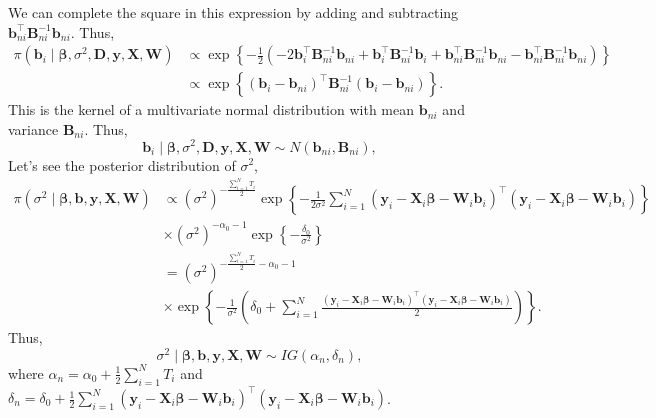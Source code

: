 We can complete the square in this expression by adding and subtracting $\bm{b}_{ni}^{\top}\bm{B}_{ni}^{-1}\bm{b}_{ni}$. Thus,
\begin{align*}
	\pi(\bm{b}_i\mid \bm{\beta},\sigma^2,\bm{D},\bm{y}, \bm{X}, \bm{W})&\propto \exp\left\{-\frac{1}{2}(-2\bm{b}_i^{\top}\bm{B}_{ni}^{-1}\bm{b}_{ni}+ \bm{b}_i^{\top}\bm{B}_{ni}^{-1}\bm{b}_i+\bm{b}_{ni}^{\top}\bm{B}_{ni}^{-1}\bm{b}_{ni}-\bm{b}_{ni}^{\top}\bm{B}_{ni}^{-1}\bm{b}_{ni})\right\}\\
	&\propto \exp\left\{(\bm{b}_i-\bm{b}_{ni})^{\top}\bm{B}_{ni}^{-1}(\bm{b}_i-\bm{b}_{ni})\right\}. 
\end{align*}
This is the kernel of a multivariate normal distribution with mean $\bm{b}_{ni}$ and variance $\bm{B}_{ni}$. Thus,
\begin{equation*}
	\bm{b}_i\mid \bm{\beta},\sigma^2,\bm{D},\bm{y}, \bm{X}, \bm{W} \sim {N}(\bm{b}_{ni},\bm{B}_{ni}), 
\end{equation*} 
Let's see the posterior distribution of $\sigma^2$,
\begin{align*}
	\pi(\sigma^2\mid \bm{\beta},\bm{b},\bm{y}, \bm{X}, \bm{W})&\propto (\sigma^2)^{-\frac{\sum_{i=1}^N T_i}{2}}\exp\left\{-\frac{1}{2\sigma^2}\sum_{i=1}^N(\bm{y}_i-\bm{X}_i\bm{\beta}-\bm{W}_i\bm{b}_i)^{\top}(\bm{y}_i-\bm{X}_i\bm{\beta}-\bm{W}_i\bm{b}_i)\right\}\\
	&\times (\sigma^2)^{-\alpha_0-1}\exp\left\{-\frac{\delta_0}{\sigma^2}\right\}\\
	&=(\sigma^2)^{-\frac{\sum_{i=1}^N T_i}{2}-\alpha_0-1}\\
	&\times \exp\left\{-\frac{1}{\sigma^2}\left(\delta_0+\sum_{i=1}^N\frac{(\bm{y}_i-\bm{X}_i\bm{\beta}-\bm{W}_i\bm{b}_i)^{\top}(\bm{y}_i-\bm{X}_i\bm{\beta}-\bm{W}_i\bm{b}_i)}{2}\right)\right\}. 
\end{align*}
Thus,
\begin{equation*}
	\sigma^2\mid  \bm{\beta}, \bm{b}, \bm{y}, \bm{X}, \bm{W} \sim {I}{G}(\alpha_n, \delta_n),
\end{equation*}
where $\alpha_n=\alpha_0+\frac{1}{2}\sum_{i=1}^N T_i$ and $\delta_n=\delta_0+\frac{1}{2}\sum_{i=1}^N(\bm{y}_i-\bm{X}_i\bm{\beta}-\bm{W}_i\bm{b}_i)^{\top}(\bm{y}_i-\bm{X}_i\bm{\beta}-\bm{W}_i\bm{b}_i)$.

